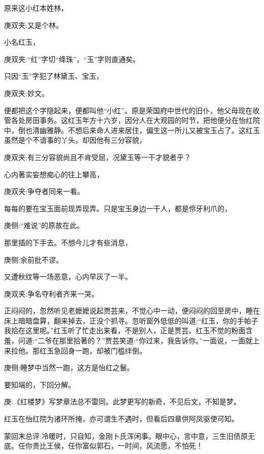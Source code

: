 \begin{parag}
    原来这小红本姓林，\begin{note}庚双夹:又是个林。\end{note}小名红玉，\begin{note}庚双夹:“红”字切“绛珠”，“玉”字则直通矣。\end{note}只因“玉”字犯了林黛玉、宝玉，\begin{note}庚双夹:妙文。\end{note}便都把这个字隐起来，便都叫他“小红”。原是荣国府中世代的旧仆，他父母现在收管各处房田事务。这红玉年方十六岁，因分人在大观园的时节，把他便分在怡红院中，倒也清幽雅静。不想后来命人进来居住，偏生这一所儿又被宝玉占了。这红玉虽然是个不谙事的丫头，却因他有三分容貌，\begin{note}庚双夹:有三分容貌尚且不肯受屈，况黛玉等一干才貌者乎？\end{note}心内著实妄想痴心的往上攀高，\begin{note}庚双夹:争夺者同来一看。\end{note}每每的要在宝玉面前现弄现弄。只是宝玉身边一干人，都是伶牙利爪的，\begin{note}庚侧:“难说”的原故在此。\end{note}那里插的下手去。不想今儿才有些消息，\begin{note}庚侧:余前批不谬。\end{note}又遭秋纹等一场恶意，心内早灰了一半。\begin{note}庚双夹:争名夺利者齐来一哭。\end{note}正闷闷的，忽然听见老嬷嬷说起贾芸来，不觉心中一动，便闷闷的回至房中，睡在床上暗暗盘算，翻来掉去，正没个抓寻。忽听窗外低低的叫道:“红玉，你的手帕子我拾在这里呢。”红玉听了忙走出来看，不是别人，正是贾芸。红玉不觉的粉面含羞，问道:“二爷在那里拾著的？”贾芸笑道:“你过来，我告诉你。”一面说，一面就上来拉他。那红玉急回身一跑，却被门槛绊倒。\begin{note}庚侧:睡梦中当然一跑，这方是怡红之鬟。\end{note}要知端的，下回分解。
\end{parag}


\begin{parag}
    \begin{note}庚:《红楼梦》写梦章法总不雷同。此梦更写的新奇，不见后文，不知是梦。\end{note}
\end{parag}


\begin{parag}
    \begin{note}红玉在怡红院为诸环所掩，亦可谓生不遇时，但看后四章供阿凤驱使可知。\end{note}
\end{parag}


\begin{parag}
    \begin{note}蒙回末总评:冷暖时，只自知，金刚卜氏浑闲事。眼中心，言中意，三生旧债原无底。任你贵比王侯，任你富似郭石，一时间，风流愿，不怕死！\end{note}
\end{parag}

